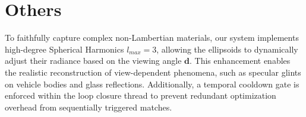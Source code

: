 \documentclass{article}
\begin{document}
\section{Others}

To faithfully capture complex non-Lambertian materials, our system implements high-degree Spherical Harmonics $l_{max}=3$, allowing the ellipsoids to dynamically adjust their radiance based on the viewing angle $\mathbf{d}$. This enhancement enables the realistic reconstruction of view-dependent phenomena, such as specular glints on vehicle bodies and glass reflections. Additionally, a temporal cooldown gate is enforced within the loop closure thread to prevent redundant optimization overhead from sequentially triggered matches.
\end{document}
